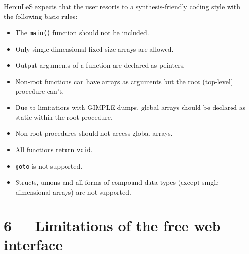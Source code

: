 \documentclass[a4paper]{article}
\begin{document}
HercuLeS expects that the user resorts to a synthesis-friendly coding style
with the following basic rules:
%
\begin{itemize}

\item The \texttt{main()} function should not be included.

\item Only single-dimensional fixed-size arrays are allowed.

\item Output arguments of a function are declared as pointers.

\item Non-root functions can have arrays as arguments but the root (top-level)
procedure can't.

\item Due to limitations with GIMPLE dumps, global arrays should be declared as
static within the root procedure.

\item Non-root procedures should not access global arrays.

\item All functions return \texttt{void}.

\item \texttt{goto} is not supported.

\item Structs, unions and all forms of compound data types (except single-
dimensional arrays) are not supported.

\end{itemize}


\section{6~~~Limitations of the free web interface%
  \label{limitations-of-the-free-web-interface}%
}
\end{document}

